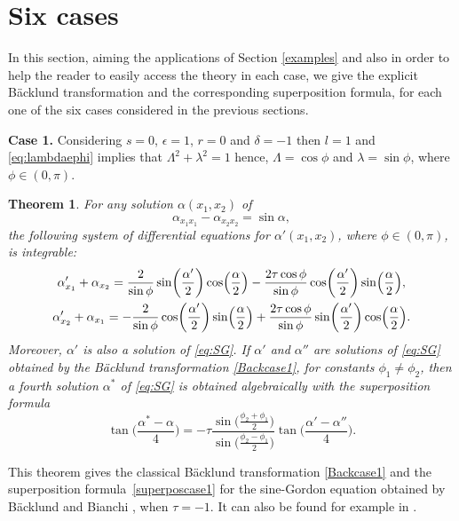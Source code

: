 \documentclass[pdftex]{sigma}
\numberwithin{equation}{section}
\newtheorem{Theorem}{Theorem}[section]
\begin{document}
\section{Six cases}\label{sec:6cases} In this section, aiming the applications of Section \ref{examples} and also in order to help the reader to easily access the theory in each case, we give the explicit
B\"acklund transformation and the corresponding superposition formula, for each one of the six cases considered in the previous sections.


{\bf Case 1.}
Considering $s=0$, $\epsilon=1$, $r=0$ and $\delta=-1$ then $l=1$ and \eqref{eq:lambdaephi} implies that $\Lambda^2+\lambda^2=1$ hence,
$\Lambda=\cos \phi$ and $\lambda=\sin\phi$, where $\phi\in (0,\pi)$.

\begin{Theorem}\label{SG}
For any solution $\alpha(x_1,x_2)$ of
\begin{equation}\label{eq:SG}
\alpha_{x_1x_1}-\alpha_{x_2x_2}=\sin \alpha,
\end{equation}
 the following system of differential equations for $\alpha'(x_1,x_2)$, where $\phi\in (0,\pi)$, is integrable:
\begin{gather}
\alpha'_{x_1}+\alpha_{x_2}=\frac{2}{\sin\phi}\sin\biggl(\frac{\alpha'}{2}\biggr)\cos\Bigl(\frac{\alpha}{2}\Bigr)-\frac{2\tau \cos\phi}{\sin\phi} \cos\biggl(\frac{\alpha'}{2}\biggr)\sin\Bigl(\frac{\alpha}{2}\Bigr),\nonumber\\
\alpha'_{x_2}+\alpha_{x_1}=-\frac{2}{\sin\phi}\cos\biggl(\frac{\alpha'}{2}\biggr)\sin\Bigl(\frac{\alpha}{2}\Bigr)+\frac{2\tau \cos\phi}{\sin\phi} \sin\biggl(\frac{\alpha'}{2}\biggr)\cos\Bigl(\frac{\alpha}{2}\Bigr).\label{Backcase1}
\end{gather}
Moreover, $\alpha'$ is also a solution of \eqref{eq:SG}. If $\alpha'$ and $\alpha''$ are solutions of \eqref{eq:SG} obtained by the B\"acklund transformation \eqref{Backcase1}, for constants $\phi_1\neq \phi_2$, then a fourth solution $\alpha^*$ of \eqref{eq:SG} is obtained algebraically with
 the superposition formula
 \begin{equation}\label{superposcase1}
\tan\biggl(\frac{\alpha^*-\alpha}{4}\biggr) =
-\tau \frac{\sin\bigl(\frac{\phi_2+\phi_1}{2}\bigr) } {\sin \bigl(\frac{\phi_2-\phi_1}{2}\bigr)}
\tan\biggl(\frac{\alpha'-\alpha''}{4}\biggr).
 \end{equation}
\end{Theorem}

This theorem gives the classical B\"acklund transformation \eqref{Backcase1} and the superposition formula~\eqref{superposcase1} for the sine-Gordon equation obtained by B\"acklund \cite{Backlund1875,Backlund1905} and Bianchi \cite{bianchi1}, when $\tau=-1$. It can also be
found for example in \cite[p.~44]{Tenenblat1998}.
\end{document}
